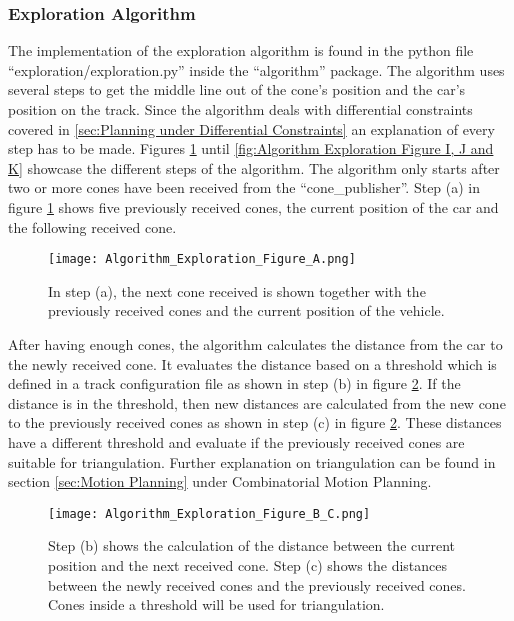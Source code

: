 \subsubsection{Exploration Algorithm} \label{sec:Exploration Algorithm}
The implementation of the exploration algorithm is found in the python file ``exploration/exploration.py'' inside the ``algorithm'' package. The algorithm uses several steps to get the middle line out of the cone's position and the car's position on the track. Since the algorithm deals with differential constraints covered in \ref{sec:Planning under Differential Constraints} an explanation of every step has to be made. Figures \ref{fig:Algorithm Exploration Figure A} until \ref{fig:Algorithm Exploration Figure I, J and K} showcase the different steps of the algorithm. The algorithm only starts after two or more cones have been received from the ``cone\_publisher''. Step (a) in figure \ref{fig:Algorithm Exploration Figure A} shows five previously received cones, the current position of the car and the following received cone.
\begin{figure}[H]
    \centering
    \texttt{[image: Algorithm\_Exploration\_Figure\_A.png]}
    \caption{In step (a), the next cone received is shown together with the previously received cones and the current position of the vehicle.}
    \label{fig:Algorithm Exploration Figure A}
\end{figure}

After having enough cones, the algorithm calculates the distance from the car to the newly received cone. It evaluates the distance based on a threshold which is defined in a track configuration file as shown in step (b) in figure \ref{fig:Algorithm Exploration Figure B and C}. If the distance is in the threshold, then new distances are calculated from the new cone to the previously received cones as shown in step (c) in figure \ref{fig:Algorithm Exploration Figure B and C}. These distances have a different threshold and evaluate if the previously received cones are suitable for triangulation. Further explanation on triangulation can be found in section \ref{sec:Motion Planning} under Combinatorial Motion Planning.
\begin{figure}[H]
    \centering
    \texttt{[image: Algorithm\_Exploration\_Figure\_B\_C.png]}
    \caption{Step (b) shows the calculation of the distance between the current position and the next received cone. Step (c) shows the distances between the newly received cones and the previously received cones. Cones inside a threshold will be used for triangulation.}
    \label{fig:Algorithm Exploration Figure B and C}
\end{figure}

